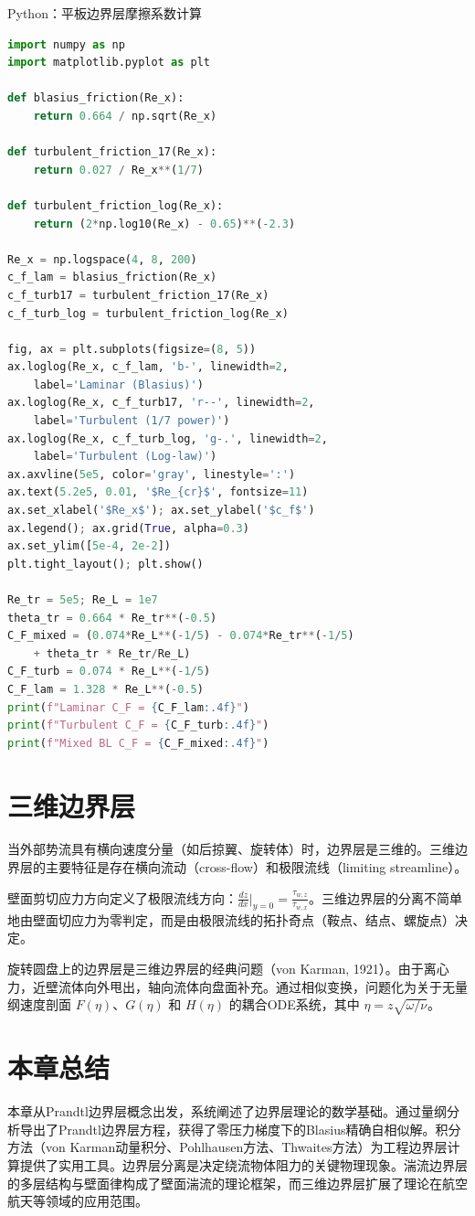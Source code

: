 \begin{mycode}{Python：平板边界层摩擦系数计算}
\begin{lstlisting}[language=Python]
import numpy as np
import matplotlib.pyplot as plt

def blasius_friction(Re_x):
    return 0.664 / np.sqrt(Re_x)

def turbulent_friction_17(Re_x):
    return 0.027 / Re_x**(1/7)

def turbulent_friction_log(Re_x):
    return (2*np.log10(Re_x) - 0.65)**(-2.3)

Re_x = np.logspace(4, 8, 200)
c_f_lam = blasius_friction(Re_x)
c_f_turb17 = turbulent_friction_17(Re_x)
c_f_turb_log = turbulent_friction_log(Re_x)

fig, ax = plt.subplots(figsize=(8, 5))
ax.loglog(Re_x, c_f_lam, 'b-', linewidth=2,
    label='Laminar (Blasius)')
ax.loglog(Re_x, c_f_turb17, 'r--', linewidth=2,
    label='Turbulent (1/7 power)')
ax.loglog(Re_x, c_f_turb_log, 'g-.', linewidth=2,
    label='Turbulent (Log-law)')
ax.axvline(5e5, color='gray', linestyle=':')
ax.text(5.2e5, 0.01, '$Re_{cr}$', fontsize=11)
ax.set_xlabel('$Re_x$'); ax.set_ylabel('$c_f$')
ax.legend(); ax.grid(True, alpha=0.3)
ax.set_ylim([5e-4, 2e-2])
plt.tight_layout(); plt.show()

Re_tr = 5e5; Re_L = 1e7
theta_tr = 0.664 * Re_tr**(-0.5)
C_F_mixed = (0.074*Re_L**(-1/5) - 0.074*Re_tr**(-1/5)
    + theta_tr * Re_tr/Re_L)
C_F_turb = 0.074 * Re_L**(-1/5)
C_F_lam = 1.328 * Re_L**(-0.5)
print(f"Laminar C_F = {C_F_lam:.4f}")
print(f"Turbulent C_F = {C_F_turb:.4f}")
print(f"Mixed BL C_F = {C_F_mixed:.4f}")
\end{lstlisting}
\end{mycode}

\section{三维边界层}

当外部势流具有横向速度分量（如后掠翼、旋转体）时，边界层是三维的。三维边界层的主要特征是存在横向流动（cross-flow）和极限流线（limiting streamline）。

壁面剪切应力方向定义了极限流线方向：$\frac{dz}{dx}\big|_{y=0} = \frac{\tau_{w,z}}{\tau_{w,x}}$。三维边界层的分离不简单地由壁面切应力为零判定，而是由极限流线的拓扑奇点（鞍点、结点、螺旋点）决定。

旋转圆盘上的边界层是三维边界层的经典问题（von Karman, 1921）。由于离心力，近壁流体向外甩出，轴向流体向盘面补充。通过相似变换，问题化为关于无量纲速度剖面 $F(\eta)$、$G(\eta)$ 和 $H(\eta)$ 的耦合ODE系统，其中 $\eta = z\sqrt{\omega/\nu}$。

\section{本章总结}

本章从Prandtl边界层概念出发，系统阐述了边界层理论的数学基础。通过量纲分析导出了Prandtl边界层方程，获得了零压力梯度下的Blasius精确自相似解。积分方法（von Karman动量积分、Pohlhausen方法、Thwaites方法）为工程边界层计算提供了实用工具。边界层分离是决定绕流物体阻力的关键物理现象。湍流边界层的多层结构与壁面律构成了壁面湍流的理论框架，而三维边界层扩展了理论在航空航天等领域的应用范围。
